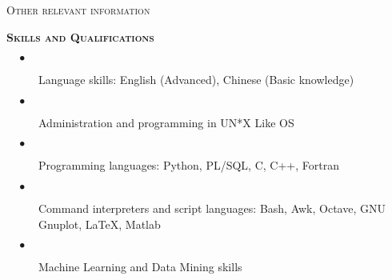 \documentclass[10pt]{article}
\begin{document}
\begin{cv}
\begin{cvlist}{\large \textsc{Other relevant information}}
\item{\bf{\textsc{Skills and Qualifications}}}
\begin{description}
 \item[\hspace{-2mm} $\quad \bullet$ \hspace{-1.5mm}] Language skills: English (Advanced), Chinese (Basic knowledge)\\[-6mm]
 \item[\hspace{-2mm} $\quad \bullet$ \hspace{-1.5mm}] Administration
   and programming in UN*X Like OS\\[-6mm]
   \item[\hspace{-2mm} $\quad \bullet$ \hspace{-1.5mm}] Programming
     languages: Python, PL/SQL, C, C++, Fortran\\[-6mm]
  \item[\hspace{-2mm} $\quad \bullet$ \hspace{-1.5mm}] Command
    interpreters and script languages: Bash, Awk, Octave, GNU Gnuplot,
    LaTeX, Matlab\\[-6mm]
\item[\hspace{-2mm} $\quad \bullet$ \hspace{-1.5mm}] Machine Learning
  and Data Mining skills\\[-6mm]
\end{description}












\end{cvlist}
\end{cv}
\end{document}
